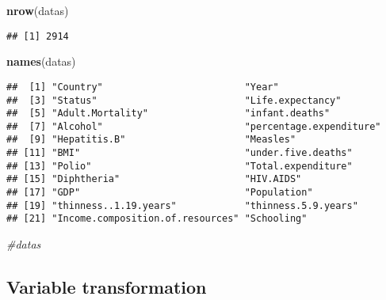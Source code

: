 \documentclass[
]{article}
\newenvironment{Shaded}{\begin{snugshade}}{\end{snugshade}}
\newcommand{\CommentTok}[1]{\textcolor[rgb]{0.56,0.35,0.01}{\textit{#1}}}
\newcommand{\FunctionTok}[1]{\textcolor[rgb]{0.13,0.29,0.53}{\textbf{#1}}}
\newcommand{\NormalTok}[1]{#1}
\begin{document}
\begin{Shaded}
\begin{Highlighting}[]
\FunctionTok{nrow}\NormalTok{(datas)}
\end{Highlighting}
\end{Shaded}

\begin{verbatim}
## [1] 2914
\end{verbatim}

\begin{Shaded}
\begin{Highlighting}[]
\FunctionTok{names}\NormalTok{(datas)}
\end{Highlighting}
\end{Shaded}

\begin{verbatim}
##  [1] "Country"                         "Year"                           
##  [3] "Status"                          "Life.expectancy"                
##  [5] "Adult.Mortality"                 "infant.deaths"                  
##  [7] "Alcohol"                         "percentage.expenditure"         
##  [9] "Hepatitis.B"                     "Measles"                        
## [11] "BMI"                             "under.five.deaths"              
## [13] "Polio"                           "Total.expenditure"              
## [15] "Diphtheria"                      "HIV.AIDS"                       
## [17] "GDP"                             "Population"                     
## [19] "thinness..1.19.years"            "thinness.5.9.years"             
## [21] "Income.composition.of.resources" "Schooling"
\end{verbatim}

\begin{Shaded}
\begin{Highlighting}[]
\CommentTok{\#datas}
\end{Highlighting}
\end{Shaded}

\subsection{Variable transformation}\label{variable-transformation}
\end{document}
